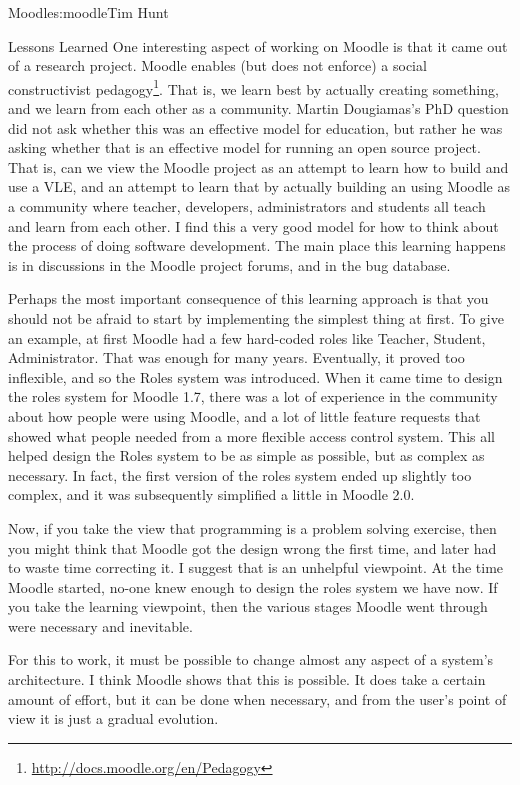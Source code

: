 \begin{aosachapter}{Moodle}{s:moodle}{Tim Hunt}
\begin{aosasect1}{Lessons Learned}
One interesting aspect of working on Moodle is that it came out of a
research project. Moodle enables (but does not enforce) a social
constructivist
pedagogy\footnote{\url{http://docs.moodle.org/en/Pedagogy}}. That is,
we learn best by actually creating something, and we learn from each
other as a community. Martin Dougiamas's PhD question did not ask
whether this was an effective model for education, but rather he was
asking whether that is an effective model for running an open source
project. That is, can we view the Moodle project as an attempt to
learn how to build and use a VLE, and an attempt to learn that by
actually building an using Moodle as a community where teacher,
developers, administrators and students all teach and learn from each
other. I find this a very good model for how to think about the
process of doing software development. The main place this learning
happens is in discussions in the Moodle project forums, and in the bug
database.

Perhaps the most important consequence of this learning approach is
that you should not be afraid to start by implementing the simplest
thing at first. To give an example, at first Moodle had a few
hard-coded roles like Teacher, Student, Administrator. That was enough
for many years. Eventually, it proved too inflexible, and so the Roles
system was introduced. When it came time to design the roles system
for Moodle 1.7, there was a lot of experience in the community about
how people were using Moodle, and a lot of little feature requests
that showed what people needed from a more flexible access control
system. This all helped design the Roles system to be as simple as
possible, but as complex as necessary. In fact, the first version of
the roles system ended up slightly too complex, and it was
subsequently simplified a little in Moodle 2.0.

Now, if you take the view that programming is a problem solving
exercise, then you might think that Moodle got the design wrong the
first time, and later had to waste time correcting it. I suggest that
is an unhelpful viewpoint. At the time Moodle started, no-one knew
enough to design the roles system we have now. If you take the
learning viewpoint, then the various stages Moodle went through were
necessary and inevitable.

For this to work, it must be possible to change almost any aspect of a
system's architecture. I think Moodle shows that this is possible. It
does take a certain amount of effort, but it can be done when
necessary, and from the user's point of view it is just a gradual
evolution.

\end{aosasect1}

\end{aosachapter}
